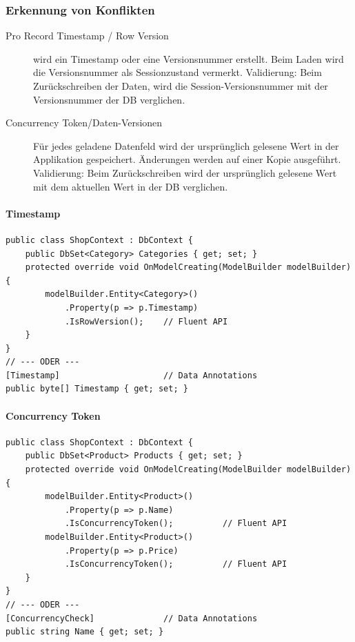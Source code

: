 \documentclass[
a4paper,
oneside,
10pt,
fleqn,
headsepline,
toc=listofnumbered, 
bibliography=totocnumbered]{scrartcl}
\begin{document}
\subsubsection{Erkennung von Konflikten}
\begin{description}
	\item[Pro Record Timestamp / Row Version] wird ein Timestamp oder eine Versionsnummer erstellt. Beim Laden wird die Versionsnummer als Sessionzustand vermerkt. Validierung: Beim Zurückschreiben der Daten, wird die Session-Versionsnummer mit der Versionsnummer der DB verglichen.
	\item[Concurrency Token/Daten-Versionen] Für jedes geladene Datenfeld wird der ursprünglich gelesene Wert in der Applikation gespeichert. Änderungen werden auf einer Kopie ausgeführt. Validierung: Beim Zurückschreiben wird der ursprünglich gelesene Wert mit dem aktuellen Wert in der DB verglichen.
\end{description}

\paragraph{Timestamp}
\begin{lstlisting}
public class ShopContext : DbContext {
    public DbSet<Category> Categories { get; set; }
    protected override void OnModelCreating(ModelBuilder modelBuilder) {
        modelBuilder.Entity<Category>()
            .Property(p => p.Timestamp)
            .IsRowVersion();    // Fluent API
    }
}
// --- ODER ---
[Timestamp]                     // Data Annotations
public byte[] Timestamp { get; set; }
\end{lstlisting}

\paragraph{Concurrency Token}
\begin{lstlisting}
public class ShopContext : DbContext {
    public DbSet<Product> Products { get; set; }
    protected override void OnModelCreating(ModelBuilder modelBuilder) {
        modelBuilder.Entity<Product>()
            .Property(p => p.Name)
            .IsConcurrencyToken();          // Fluent API
        modelBuilder.Entity<Product>()
            .Property(p => p.Price)
            .IsConcurrencyToken();          // Fluent API
    }
}
// --- ODER ---
[ConcurrencyCheck]              // Data Annotations
public string Name { get; set; }
\end{lstlisting}
\end{document}

